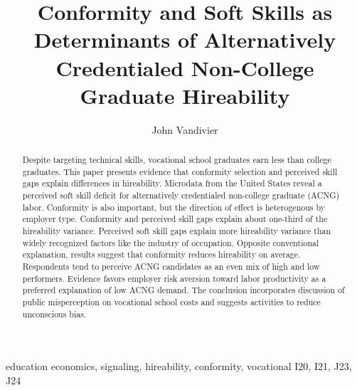 \documentclass[review]{elsarticle}
\begin{document}
\begin{frontmatter}

    \title{
        Conformity and Soft Skills as Determinants of Alternatively Credentialed Non-College Graduate Hireability
    }

    \author[mymainaddress]{John Vandivier}
    \address[mymainaddress]{4400 University Dr, Fairfax, VA 22030}

    \begin{abstract}
        Despite targeting technical skills,
        vocational school graduates earn less than college graduates.
        This paper presents evidence that
        conformity selection and perceived skill gaps explain differences in hireability.
        Microdata from the United States
        reveal a perceived soft skill deficit for
        alternatively credentialed non-college graduate (ACNG) labor.
        Conformity is also important,
        but the direction of effect is heterogenous by employer type.
        Conformity and perceived skill gaps explain about one-third of the hireability variance.
        Perceived soft skill gaps explain more hireability variance than widely recognized factors like the industry of occupation.
        Opposite conventional explanation, results suggest that conformity reduces hireability on average.
        Respondents tend to perceive ACNG candidates as an even mix of high and low performers.
        Evidence favors employer risk aversion toward labor productivity as a preferred explanation of low ACNG demand.
        The conclusion incorporates discussion of public misperception on vocational school costs and suggests activities to reduce unconscious bias.
    \end{abstract}

    \begin{keyword}
        education economics, signaling, hireability, conformity, vocational               %
        \MSC[2010] I20, I21, J23, J24                                                     %
    \end{keyword}

\end{frontmatter}
\end{document}
